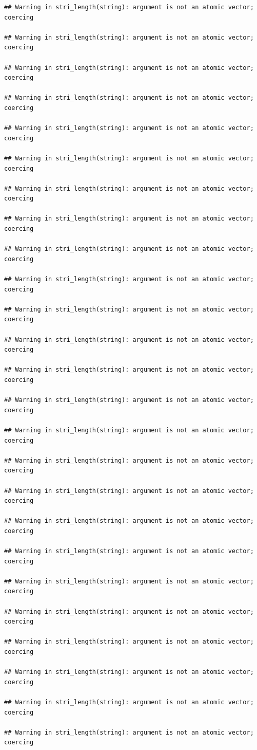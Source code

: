 \documentclass[
]{article}
\begin{document}
\begin{verbatim}
## Warning in stri_length(string): argument is not an atomic vector; coercing

## Warning in stri_length(string): argument is not an atomic vector; coercing

## Warning in stri_length(string): argument is not an atomic vector; coercing

## Warning in stri_length(string): argument is not an atomic vector; coercing

## Warning in stri_length(string): argument is not an atomic vector; coercing

## Warning in stri_length(string): argument is not an atomic vector; coercing

## Warning in stri_length(string): argument is not an atomic vector; coercing

## Warning in stri_length(string): argument is not an atomic vector; coercing

## Warning in stri_length(string): argument is not an atomic vector; coercing

## Warning in stri_length(string): argument is not an atomic vector; coercing

## Warning in stri_length(string): argument is not an atomic vector; coercing

## Warning in stri_length(string): argument is not an atomic vector; coercing

## Warning in stri_length(string): argument is not an atomic vector; coercing

## Warning in stri_length(string): argument is not an atomic vector; coercing

## Warning in stri_length(string): argument is not an atomic vector; coercing

## Warning in stri_length(string): argument is not an atomic vector; coercing

## Warning in stri_length(string): argument is not an atomic vector; coercing

## Warning in stri_length(string): argument is not an atomic vector; coercing

## Warning in stri_length(string): argument is not an atomic vector; coercing

## Warning in stri_length(string): argument is not an atomic vector; coercing

## Warning in stri_length(string): argument is not an atomic vector; coercing

## Warning in stri_length(string): argument is not an atomic vector; coercing

## Warning in stri_length(string): argument is not an atomic vector; coercing

## Warning in stri_length(string): argument is not an atomic vector; coercing

## Warning in stri_length(string): argument is not an atomic vector; coercing
\end{verbatim}
\end{document}
